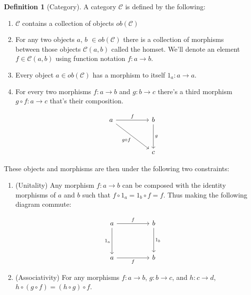 \documentclass{article}
\theoremstyle{definition}
\newtheorem{definition}{Definition}
\begin{document}
\begin{definition}[Category]
    A category $\mathcal{C}$ is defined by the following:
    \begin{enumerate}
        \item $\mathcal{C}$ contains a collection of objects $ob(\mathcal{C})$
        \item For any two objects $a$, $b$ $\in ob(\mathcal{C})$ there is a collection of morphisms between those objects $\mathcal{C}(a,b)$ called the homset. We'll denote an element $f\in\mathcal{C}(a,b)$ using function notation $f:a\rightarrow b$.
        \item Every object $a\in ob(\mathcal{C})$ has a morphism to itself $1_a:a\rightarrow a$.
        \item For every two morphisms $f:a\rightarrow b$ and $g: b\rightarrow c$ there's a third morphism $g\circ f:a\rightarrow c$ that's their composition.

              \[\begin{tikzcd}
                      a && b \\
                      \\
                      && c
                      \arrow["f", from=1-1, to=1-3]
                      \arrow["g", from=1-3, to=3-3]
                      \arrow["{g\circ f}"', from=1-1, to=3-3]
                  \end{tikzcd}\]

    \end{enumerate}
    These objects and morphisms are then under the following two constraints:
    \begin{enumerate}
        \item (Unitality) Any morphism $f:a\rightarrow b$ can be composed with the identity morphisms of $a$ and $b$ such that $f\circ 1_a=1_b\circ f=f$. Thus making the following diagram commute:

              \[\begin{tikzcd}
                      a && b \\
                      \\
                      a && b
                      \arrow["f", from=1-1, to=1-3]
                      \arrow["{1_a}"', from=1-1, to=3-1]
                      \arrow["{1_b}", from=1-3, to=3-3]
                      \arrow["f"', from=3-1, to=3-3]
                  \end{tikzcd}\]

        \item (Associativity) For any morphisms $f:a\rightarrow b$, $g:b\rightarrow c$, and $h:c\rightarrow d$, $h\circ (g\circ f)=(h\circ g)\circ f$.


\end{enumerate}
\end{definition}
\end{document}
